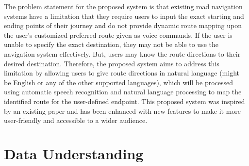 \documentclass{epsrc}
\begin{document}
The problem statement for the proposed system is that existing road navigation systems have a limitation that they require users to input the exact starting and ending points of their journey and do not provide dynamic route mapping upon the user's customized preferred route given as voice commands. If the user is unable to specify the exact destination, they may not be able to use the navigation system effectively. But, users may know the route directions to their desired destination. Therefore, the proposed system aims to address this limitation by allowing users to give route directions in natural language (might be English or any of the other supported languages), which will be processed using automatic speech recognition and natural language processing to map the identified route for the user-defined endpoint. This proposed system was inspired by an existing paper\cite{8629859} and has been enhanced with new features to make it more user-friendly and accessible to a wider audience.
\vspace{5pt}


\vspace{5pt}

\section{Data Understanding}
\vspace{5pt}
\end{document}
